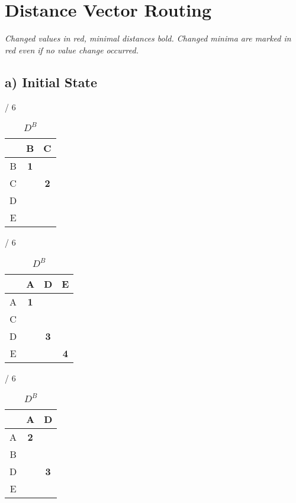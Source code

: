 \documentclass[a4paper, 11 pt, article, accentcolor=tud7b]{tudreport}
\begin{document}
	\newpage
	
	\section{Distance Vector Routing}
	
	\textit{Changed values in red, minimal distances bold. Changed minima are marked in red even if no value change occurred.}
	
	\subsection*{a) Initial State}
	\begin{table}[h]
	  \begin{subtable}[b]{\textwidth / 6}
	    \begin{tabular}{| c | c | c |}
	      \hline
	        & B & C \\ \hline
	      B & \textbf{1} &   \\ \hline
	      C &   & \textbf{2} \\ \hline
	      D &   &   \\ \hline
	      E &   &   \\ \hline
	    \end{tabular}
	    \caption{$D^{A}$}
	  \end{subtable}
	  \hfill
	  \begin{subtable}[b]{\textwidth / 6}
	    \begin{tabular}{| c | c | c | c |}
	    \hline
	      & A & D & E \\ \hline
	    A & \textbf{1} &   &   \\ \hline
	    C &   &   &   \\ \hline
	    D &   & \textbf{3} &   \\ \hline
	    E &   &   & \textbf{4} \\ \hline
	    \end{tabular}
	    \caption{$D^{B}$}
	  \end{subtable}
	  \hfill
	  \begin{subtable}[b]{\textwidth / 6}
	    \begin{tabular}{| c | c | c |}
	    \hline
	      & A & D \\ \hline
	    A & \textbf{2} &   \\ \hline
	    B &   &   \\ \hline
	    D &   & \textbf{3} \\ \hline
	    E &   &   \\ \hline
	    \end{tabular}

\end{subtable}
\end{table}
\end{document}
